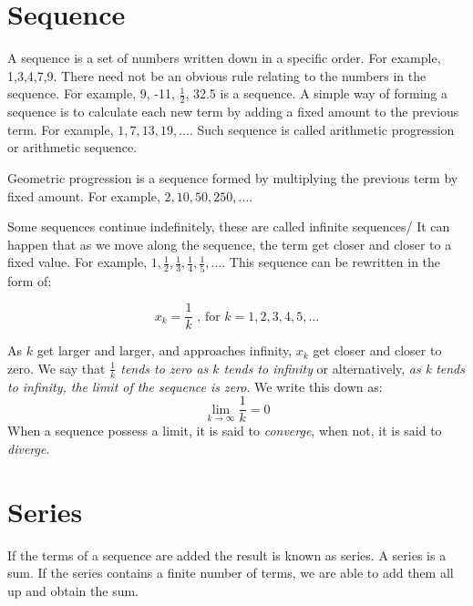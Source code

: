 \section{Sequence}
A sequence is a set of numbers written down in a specific order. For example, 1,3,4,7,9. There need not be an obvious rule relating to the numbers in the sequence. For example, 9, -11, $\frac{1}{2}$, 32.5 is a sequence.\newline
A simple way of forming a sequence is to calculate each new term by adding a fixed amount to the previous term. For example, $1,7,13,19, \dots$.\newline
Such sequence is called arithmetic progression or arithmetic sequence.

\vspace{5mm}

\noindent Geometric progression is a sequence formed by multiplying the previous term by fixed amount. For example, $2,10,50, 250,\dots$.

\vspace{5mm}

\noindent Some sequences continue indefinitely, these are called infinite sequences/ It can happen that as we move along the sequence, the term get closer and closer to a fixed value. For example, $1,\frac{1}{2},\frac{1}{3},\frac{1}{4},\frac{1}{5}, \dots$.\newline
This sequence can be rewritten in the form of:

\begin{equation}\label{eq3}
	x_k = \frac{1}{k} \text{ , for } k = 1, 2,3,4,5,\dots
\end{equation}

\noindent As $k$ get larger and larger, and approaches infinity, $x_k$ get closer and closer to zero. We say that \textit{$\frac{1}{k}$ tends to zero as $k$ tends to infinity} or alternatively, \textit{as k tends to infinity, the limit of the sequence is zero}. We write this down as:
\begin{equation}\label{eq4}
\lim_{k \to \infty} \frac{1}{k} = 0
\end{equation}
\noindent When a sequence possess a limit, it is said to \textit{converge}, when not, it is said to \textit{diverge}.
\section{Series}
\noindent If the terms of a sequence are added the result is known as series. A series is a sum. If the series contains a finite number of terms, we are able to add them all up and obtain the sum.\newline

